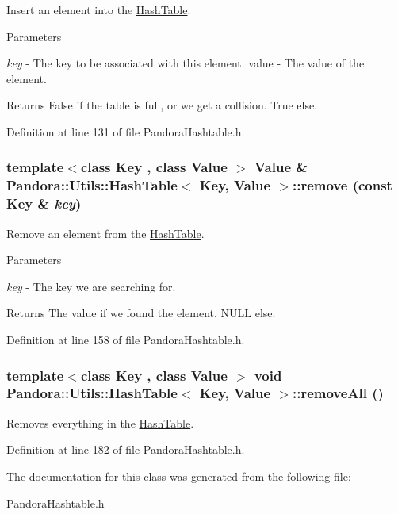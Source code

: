 Insert an element into the \hyperlink{classPandora_1_1Utils_1_1HashTable}{HashTable}. 
\begin{DoxyParams}{Parameters}
\item[{\em key}]-\/ The key to be associated with this element. value -\/ The value of the element. \end{DoxyParams}
\begin{DoxyReturn}{Returns}
False if the table is full, or we get a collision. True else. 
\end{DoxyReturn}


Definition at line 131 of file PandoraHashtable.h.\hypertarget{classPandora_1_1Utils_1_1HashTable_ad5c2861d3938bb8e6e4b21bbf7fde6df}{
\subsubsection[{remove}]{\setlength{\rightskip}{0pt plus 5cm}template$<$class Key , class Value $>$ Value \& {\bf Pandora::Utils::HashTable}$<$ Key, Value $>$::remove (const Key \& {\em key})}}
\label{classPandora_1_1Utils_1_1HashTable_ad5c2861d3938bb8e6e4b21bbf7fde6df}


Remove an element from the \hyperlink{classPandora_1_1Utils_1_1HashTable}{HashTable}. 
\begin{DoxyParams}{Parameters}
\item[{\em key}]-\/ The key we are searching for. \end{DoxyParams}
\begin{DoxyReturn}{Returns}
The value if we found the element. NULL else. 
\end{DoxyReturn}


Definition at line 158 of file PandoraHashtable.h.\hypertarget{classPandora_1_1Utils_1_1HashTable_af541b0c8a7ababea86db5cfda3da0a2e}{
\subsubsection[{removeAll}]{\setlength{\rightskip}{0pt plus 5cm}template$<$class Key , class Value $>$ void {\bf Pandora::Utils::HashTable}$<$ Key, Value $>$::removeAll ()}}
\label{classPandora_1_1Utils_1_1HashTable_af541b0c8a7ababea86db5cfda3da0a2e}


Removes everything in the \hyperlink{classPandora_1_1Utils_1_1HashTable}{HashTable}. 

Definition at line 182 of file PandoraHashtable.h.

The documentation for this class was generated from the following file:\begin{DoxyCompactItemize}
\item 
PandoraHashtable.h\end{DoxyCompactItemize}
